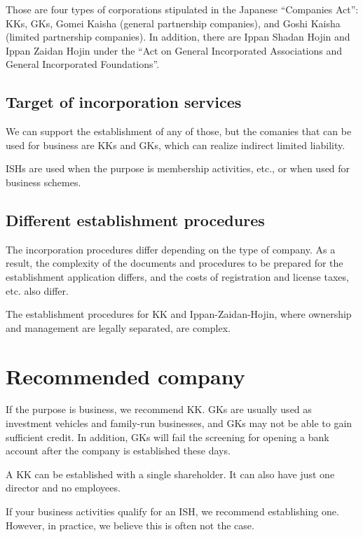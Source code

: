 Those are four types of corporations stipulated in the Japanese ``Companies Act'': KKs, GKs, Gomei Kaisha (general partnership companies), and Goshi Kaisha (limited partnership companies). In addition, there are Ippan Shadan Hojin and Ippan Zaidan Hojin under the ``Act on General Incorporated Associations and General Incorporated Foundations''.

\subsection{Target of incorporation services}
We can support the establishment of any of those, but the comanies that can be used for business are KKs and GKs, which can realize indirect limited liability.

ISHs are used when the purpose is membership activities, etc., or when used for business schemes.

\subsection{Different establishment procedures}
The incorporation procedures differ depending on the type of company. As a result, the complexity of the documents and procedures to be prepared for the establishment application differs, and the costs of registration and license taxes, etc. also differ.

The establishment procedures for KK and Ippan-Zaidan-Hojin, where ownership and management are legally separated, are complex.

\section{Recommended company}
If the purpose is business, we recommend KK. GKs are usually used as investment vehicles and family-run businesses, and GKs may not be able to gain sufficient credit. In addition, GKs will fail the screening for opening a bank account after the company is established these days.

A KK can be established with a single shareholder. It can also have just one director and no employees.

If your business activities qualify for an ISH, we recommend establishing one. However, in practice, we believe this is often not the case.

\clearpage








